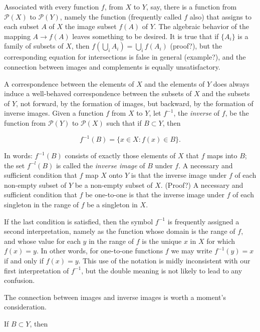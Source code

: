 Associated with every function $f$, from $X$ to $Y$, say, there is a function from $\mathcal{P}(X)$ to $\mathcal{P}(Y)$, namely the function (frequently called $f$ also) that assigns to each subset $A$ of $X$ the image subset $f(A)$ of $Y$. The algebraic behavior of the mapping $A \rightarrow f(A)$ leaves something to be desired. It is true that if $ \{ A_{i} \} $ is a family of subsets of $X$, then $f( \bigcup_{i} A_{i} ) = \bigcup_{i} f( A_{i} )$ (proof?), but the corresponding equation for intersections is false in general (example?), and the connection between images and complements is equally unsatisfactory. 

A correspondence between the elements of $X$ and the elements of $Y$ does always induce a well-behaved correspondence between the subsets of $X$ and the subsets of $Y$, not forward, by the formation of images, but backward, by the formation of inverse images. Given a function $f$ from $X$ to $Y$, let $f^{-1}$, the \textit{inverse} of $f$, be the function from $\mathcal{P}(Y)$ to $\mathcal{P}(X)$ such that if $B \subset Y$, then

\begin{equation*}
f^{-1}(B) = \{ x \in X : f(x) \in B \} .
\end{equation*}

In words: $f^{-1}(B)$ consists of exactly those elements of $X$ that $f$ maps into $B$; the set $f^{-l}(B)$ is called the \textit{inverse image} of $B$ under $f$. A necessary and sufficient condition that $f$ map $X$ onto $Y$ is that the inverse image under $f$ of each non-empty subset of $Y$ be a non-empty subset of $X$. (Proof?) A necessary and sufficient condition that $f$ be one-to-one is that the inverse image under $f$ of each singleton in the range of $f$ be a singleton in $X$. 

If the last condition is satisfied, then the symbol $f^{-1}$ is frequently assigned a second interpretation, namely as the function whose domain is the range of $f$, and whose value for each $y$ in the range of $f$ is the unique $x$ in $X$ for which $f(x) = y$. In other words, for one-to-one functions $f$ we may write $f^{-1}(y) = x$ if and only if $f(x) = y$. This use of the notation is midly inconsistent with our first interpretation of $f^{-1}$, but the double meaning is not likely to lead to any confusion.

The connection between images and inverse images is worth a moment's consideration. 

If $B \subset Y$, then

